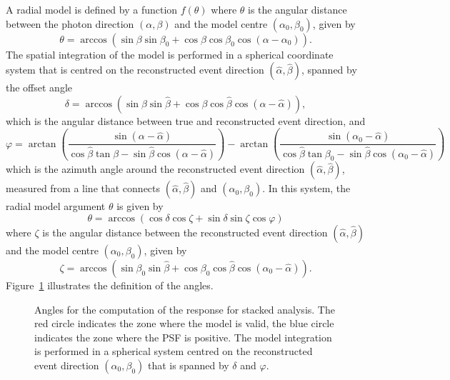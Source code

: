 \documentclass{article}[12pt,a4]
\begin{document}
A radial model is defined by a function $f(\theta)$ where $\theta$ is the angular distance between
the photon direction $(\alpha,\beta)$ and the model centre $(\alpha_0,\beta_0)$, given by
\begin{equation}
\theta = \arccos{ \left( \sin \beta \sin \beta_0 + \cos \beta \cos \beta_0 \cos (\alpha-\alpha_0) \right) } .
\end{equation}
The spatial integration of the model is performed in a spherical coordinate system that is centred on
the reconstructed event direction $(\hat{\alpha},\hat{\beta})$, spanned by the offset angle
\begin{equation}
\delta = \arccos{ \left( \sin \beta \sin \hat{\beta} + \cos \beta \cos \hat{\beta} \cos (\alpha-\hat{\alpha}) \right) } ,
\end{equation}
which is the angular distance between true and reconstructed event direction, and
\begin{equation}
\varphi =
\arctan \left( \frac{\sin(\alpha-\hat{\alpha})}{\cos \hat{\beta} \tan \beta - \sin \hat{\beta} \cos(\alpha-\hat{\alpha})} \right) -
\arctan \left( \frac{\sin(\alpha_0-\hat{\alpha})}{\cos \hat{\beta} \tan \beta_0 - \sin \hat{\beta} \cos(\alpha_0-\hat{\alpha})} \right)
\end{equation}
which is the azimuth angle around the reconstructed event direction $(\hat{\alpha},\hat{\beta})$,
measured from a line that connects $(\hat{\alpha},\hat{\beta})$ and $(\alpha_0,\beta_0)$.
In this system, the radial model argument $\theta$ is given by
\begin{equation}
\theta = \arccos{ \left( \cos \delta \cos \zeta + \sin \delta \sin \zeta \cos \varphi \right) }
\end{equation}
where
$\zeta$ is the angular distance between the reconstructed event direction $(\hat{\alpha},\hat{\beta})$ and
the model centre $(\alpha_0,\beta_0)$, given by
\begin{equation}
\zeta = \arccos{ \left( \sin \beta_0 \sin \hat{\beta} + \cos \beta_0 \cos \hat{\beta} \cos (\alpha_0-\hat{\alpha}) \right) } .
\end{equation}
Figure~\ref{fig:radial-model} illustrates the definition of the angles.

\begin{figure}[!t]
\center
{}
\caption{Angles for the computation of the response for stacked analysis. The red circle indicates
the zone where the model is valid, the blue circle indicates the zone where the PSF is positive. The
model integration is performed in a spherical system centred on the reconstructed event
direction $(\alpha_0,\beta_0)$ that is spanned by $\delta$ and $\varphi$.}
\label{fig:radial-model}
\end{figure}
\end{document}
